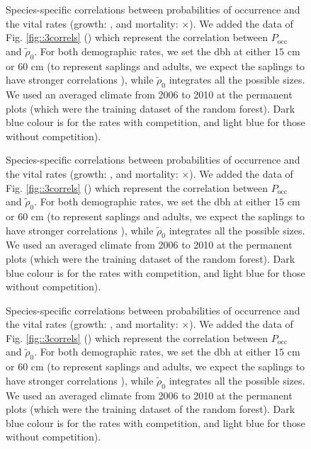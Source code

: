 \begin{refsection}
\begin{figure}
	\centering
	
	\caption{Species-specific correlations between probabilities of occurrence and the vital rates (growth: \CircSteel, and mortality: $ \times $). We added the data of Fig. \ref{fig::3correls} (\MoveUp) which represent the correlation between $ P_{\text{occ}} $ and $ \tilde \rho_0 $. For both demographic rates, we set the dbh at either $ 15 $ cm or $ 60 $ cm (to represent saplings and adults, we expect the saplings to have stronger correlations \citep{Kunstler2019}), while $ \tilde \rho_0 $ integrates all the possible sizes. We used an averaged climate from 2006 to 2010 at the permanent plots (which were the training dataset of the random forest). Dark blue colour is for the rates with competition, and light blue for those without competition). \label{fig::demog_Pocc5-8}}
\end{figure}

\begin{figure}
	\centering
	
	\caption{Species-specific correlations between probabilities of occurrence and the vital rates (growth: \CircSteel, and mortality: $ \times $). We added the data of Fig. \ref{fig::3correls} (\MoveUp) which represent the correlation between $ P_{\text{occ}} $ and $ \tilde \rho_0 $. For both demographic rates, we set the dbh at either $ 15 $ cm or $ 60 $ cm (to represent saplings and adults, we expect the saplings to have stronger correlations \citep{Kunstler2019}), while $ \tilde \rho_0 $ integrates all the possible sizes. We used an averaged climate from 2006 to 2010 at the permanent plots (which were the training dataset of the random forest). Dark blue colour is for the rates with competition, and light blue for those without competition). \label{fig::demog_Pocc9-12}}
\end{figure}

\begin{figure}
	\centering
	
	\caption{Species-specific correlations between probabilities of occurrence and the vital rates (growth: \CircSteel, and mortality: $ \times $). We added the data of Fig. \ref{fig::3correls} (\MoveUp) which represent the correlation between $ P_{\text{occ}} $ and $ \tilde \rho_0 $. For both demographic rates, we set the dbh at either $ 15 $ cm or $ 60 $ cm (to represent saplings and adults, we expect the saplings to have stronger correlations \citep{Kunstler2019}), while $ \tilde \rho_0 $ integrates all the possible sizes. We used an averaged climate from 2006 to 2010 at the permanent plots (which were the training dataset of the random forest). Dark blue colour is for the rates with competition, and light blue for those without competition). \label{fig::demog_Pocc13-14}}
\end{figure}

\printbibliography[heading=subbibliography]
\end{refsection}
